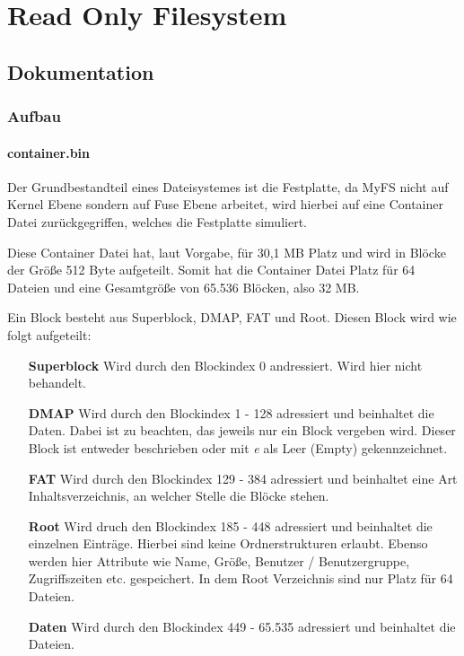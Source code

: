 \part{Read Only Filesystem }
\chapter{Dokumentation}
\section{Aufbau}
\subsection{container.bin}
Der Grundbestandteil eines Dateisystemes ist die Festplatte, da MyFS nicht auf Kernel Ebene sondern auf Fuse Ebene arbeitet, wird hierbei auf eine Container Datei zurückgegriffen, welches die Festplatte simuliert. 

Diese Container Datei hat, laut Vorgabe, für 30,1 MB Platz und wird in Blöcke der Größe 512 Byte aufgeteilt. Somit hat die Container Datei Platz für 64 Dateien und eine Gesamtgröße von 65.536 Blöcken, also 32 MB. 

Ein Block besteht aus Superblock, DMAP, FAT und Root. Diesen Block wird wie folgt aufgeteilt:

\begin{itemize}
	\item[\textbf{Superblock}] Wird durch den Blockindex 0 andressiert. Wird hier nicht behandelt.
	\item[\textbf{DMAP}] Wird durch den Blockindex 1 - 128 adressiert und beinhaltet die Daten. Dabei ist zu beachten, das jeweils nur ein Block vergeben wird. Dieser Block ist entweder beschrieben oder mit \textit{e} als Leer (Empty) gekennzeichnet.
	\item[\textbf{FAT}] Wird durch den Blockindex 129 - 384 adressiert und beinhaltet eine Art Inhaltsverzeichnis, an welcher Stelle die Blöcke stehen. 
	\item[\textbf{Root}] Wird druch den Blockindex 185 - 448 adressiert und beinhaltet die einzelnen Einträge. Hierbei sind keine Ordnerstrukturen erlaubt. Ebenso werden hier Attribute wie Name, Größe, Benutzer / Benutzergruppe, Zugriffszeiten etc. gespeichert. In dem Root Verzeichnis sind nur Platz für 64 Dateien.
	\item[\textbf{Daten}] Wird durch den Blockindex 449 - 65.535 adressiert und beinhaltet die Dateien.
\end{itemize} 

